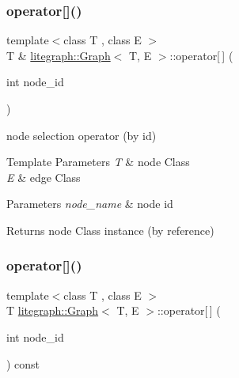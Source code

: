 \subsubsection{\texorpdfstring{operator[]()}{operator[]()}\hspace{0.1cm}{\footnotesize\ttfamily [1/4]}}
{\footnotesize\ttfamily template$<$class T , class E $>$ \\
T \& \hyperlink{classlitegraph_1_1Graph}{litegraph\+::\+Graph}$<$ T, E $>$\+::operator\mbox{[}$\,$\mbox{]} (\begin{DoxyParamCaption}\item[{int}]{node\+\_\+id }\end{DoxyParamCaption})}



node selection operator (by id) 


\begin{DoxyTemplParams}{Template Parameters}
{\em T} & node Class \\
\hline
{\em E} & edge Class \\
\hline
\end{DoxyTemplParams}

\begin{DoxyParams}{Parameters}
{\em node\+\_\+name} & node id\\
\hline
\end{DoxyParams}
\begin{DoxyReturn}{Returns}
node Class instance (by reference) 
\end{DoxyReturn}
\mbox{\label{classlitegraph_1_1Graph_a791c3a42fa2150cbf02baed18765f72e}} 
\subsubsection{\texorpdfstring{operator[]()}{operator[]()}\hspace{0.1cm}{\footnotesize\ttfamily [2/4]}}
{\footnotesize\ttfamily template$<$class T , class E $>$ \\
T \hyperlink{classlitegraph_1_1Graph}{litegraph\+::\+Graph}$<$ T, E $>$\+::operator\mbox{[}$\,$\mbox{]} (\begin{DoxyParamCaption}\item[{int}]{node\+\_\+id }\end{DoxyParamCaption}) const}



